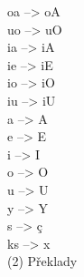 \documentclass{article}
\begin{document}
\begin{multicols}{6}
 oa  -->  oA \\
 uo  -->  uO \\
 ia  -->  iA \\
 ie  -->  iE \\
 io  -->  iO \\
 iu  -->  iU \\
  a  -->   A \\
  e  -->   E \\
  i  -->   I \\
  o  -->   O \\
  u  -->   U \\
  y  -->   Y \\
 s   -->  ç \\
 ks  -->  x \\

(2) Překlady


\end{multicols}
\end{document}
